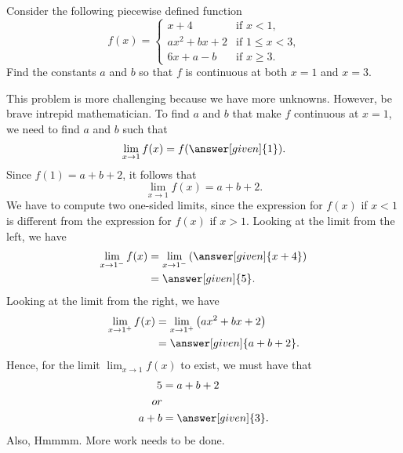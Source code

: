 \documentclass{ximera}
\begin{document}
\begin{example}
Consider the following piecewise defined function
\[
f(x) = 
\begin{cases}
  x+4 &\text{if $x<1$,}\\
  ax^2+bx+2 &\text{if $1\le x< 3$,}\\
  6x+a-b &\text{if $x\ge 3$.}
\end{cases}
\]
Find the constants $a$ and $b$ so that $f$ is continuous at both $x=1$ and $x=3$.
\begin{explanation}
This problem is more challenging because we have more
unknowns. However, be brave intrepid mathematician.  To find $a$ and
$b$ that make $f$ continuous at $x=1$, we need to find $a$ and $b$
such that
\[
\lim_{x\to 1} f(x) =f(\answer[given]{1}).
\]
Since $f(1)=a+b+2$, it follows that 
\[
\lim_{x\to 1} f(x) =a+b+2.
\]
We have to compute two one-sided limits, since the expression for  $f(x)$ if $x<1$ is  different from the expression for $f(x)$ if $x>1$.
Looking at the limit from the left, we have
\begin{align*}
  \lim_{x\to 1^-} f(x) &= \lim_{x\to 1^-} \left(\answer[given]{x+4}\right) \\
  &=\answer[given]{5}.
\end{align*}
Looking at the limit from the right, we have
\begin{align*}
  \lim_{x\to 1^+} f(x) &= \lim_{x\to 1^+} \left(ax^2+bx+2\right) \\
  &= \answer[given]{a+b+2}.
\end{align*}
Hence, for the limit $\lim_{x\to 1} f(x)$ to exist, we must have that 
\begin{align*}
  5 &= a+b+2\\ or\\
  a+b &= \answer[given]{3}.
\end{align*}
Also, 
Hmmmm. More work needs to be done.


\end{explanation}
\end{example}
\end{document}

